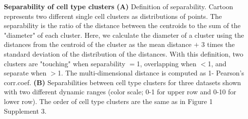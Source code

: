 \textbf{Separability of cell type clusters}
\textbf{(A)} Definition of separability. Cartoon represents two different single cell clusters as distributions of points. The separability is the ratio of the distance between the centroids to the sum of the "diameter" of each cluster. Here, we calculate the diameter of a cluster using the distances from the centroid of the cluster as the mean distance $+$ 3 times the standard deviation of the distribution of the distances. With this definition, two clusters are "touching" when separability $=$1, overlapping when $<$1, and separate when $>$1. The multi-dimensional distance is computed as 1- Pearson's corr.coef.
\textbf{(B)} Separabilities between cell type clusters for three datasets shown with two different dynamic ranges (color scale; 0-1 for upper row and 0-10 for lower row).  The order of cell type clusters are the same as in Figure 1 Supplement 3.